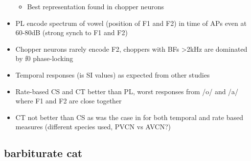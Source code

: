 \documentclass[10pt,a4paper]{article}
\begin{document}
\begin{itemize}
  \begin{itemize}
  \item Best representation found in chopper neurons
  \end{itemize}
\item PL encode spectrum of vowel (position of F1 and F2) in time of APs even at
  60-80dB (strong synch to F1 and F2)
\item Chopper neurons rarely encode F2, choppers with BFs {\textgreater}2kHz are
  dominated by f0 phase-locking
\item Temporal responses (is SI values) as expected from other studies
\item Rate-based CS and CT better than PL, worst responses from /o/ and /a/
  where F1 and F2 are close together
\item CT not better than CS as was the case in \citep{BlackburnSachs:1990} for
  both temporal and rate based measures (different species used, PVCN vs AVCN?)
\end{itemize}


\subsection{\citep{BlackburnSachs:1990} barbiturate cat}
\end{document}
